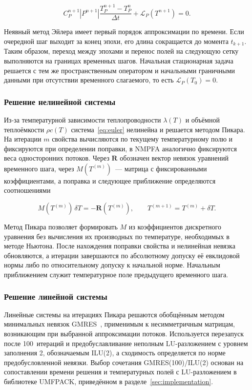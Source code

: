 \begin{equation}
 C_P^{n+1}|P^{n+1}|\frac{T_P^{n+1} - T_P^n}{\Delta t}
       + \mathcal L_P(T^{n+1}) = 0.
 \label{eq:euler}
\end{equation}

Неявный метод Эйлера имеет первый порядок аппроксимации по времени. Если очередной шаг выходит за конец эпохи, его длина сокращается до момента $t_{k+1}$. Таким образом, переход между эпохами и перенос полей на следующую сетку выполняются на границах временных шагов. Начальная стационарная задача решается с тем же пространственным оператором и начальными граничными данными при отсутствии временного слагаемого, то есть $\mathcal L_P(T_0)=0$.

\subsubsection{Решение нелинейной системы}

Из-за температурной зависимости теплопроводности $\lambda(T)$ и объёмной теплоёмкости $\rho c(T)$ система~\eqref{eq:euler} нелинейна и решается методом Пикара. На итерации $m$ свойства вычисляются по текущему температурному полю и фиксируются при определении поправки, в NMPFA аналогично фиксируются веса односторонних потоков. Через $\boldsymbol R$ обозначен вектор невязок уравнений временного шага, через $M(T^{(m)})$~--- матрица с фиксированными коэффициентами, а поправка и следующее приближение определяются соотношениями

\begin{equation}
 M(T^{(m)})\,\delta T = -\boldsymbol R(T^{(m)}),\qquad
 T^{(m+1)} = T^{(m)} + \delta T.
\end{equation}

Метод Пикара позволяет формировать $M$ из коэффициентов дискретного уравнения без вычисления их производных по температуре, необходимых в методе Ньютона. После нахождения поправки свойства и нелинейная невязка обновляются, а итерации завершаются по абсолютному допуску её евклидовой нормы либо по относительному допуску к начальной норме. Начальным приближением служит температурное поле предыдущего временного шага.

\subsubsection{Решение линейной системы}

Линейные системы на итерациях Пикара решаются обобщённым методом минимальных невязок GMRES~\cite{saad1986}, применимым к несимметричным матрицам, возникающим при выбранной аппроксимации потоков. Используется перезапуск после 100~итераций и предобуславливание неполным LU-разложением с уровнем заполнения 2, обозначаемым ILU(2), а сходимость определяется по норме предобусловленной невязки. Выбор сочетания GMRES(100)/ILU(2) основан на сопоставлении времени решения и температурных полей с LU-разложением в библиотеке UMFPACK, приведённом в разделе~\ref{sec:implementation}.

